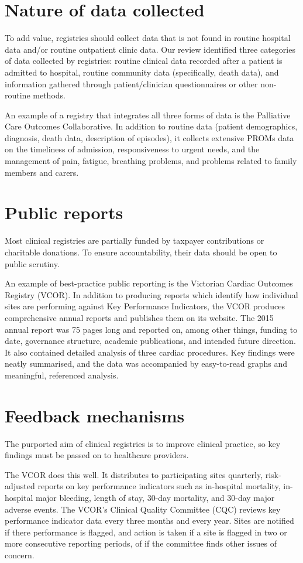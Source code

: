 \documentclass[FrontPage]{grattan}
\begin{document}
\section{Nature of data collected}
To add value, registries should collect data that is not found in routine hospital data and/or routine outpatient clinic data. Our review identified three categories of data collected by registries: routine clinical data recorded after a patient is admitted to hospital, routine community data (specifically, death data), and information gathered through patient/clinician questionnaires or other non-routine methods. 

An example of a registry that integrates all three forms of data is the Palliative Care Outcomes Collaborative. In addition to routine data (patient demographics, diagnosis, death data, description of episodes), it collects extensive PROMs data on the timeliness of admission, responsiveness to urgent needs, and the management of pain, fatigue, breathing problems, and problems related to family members and carers.

\section{Public reports}
Most clinical registries are partially funded by taxpayer contributions or charitable donations. To ensure accountability, their data should be open to public scrutiny. 

An example of best-practice public reporting is the Victorian Cardiac Outcomes Registry (VCOR). In addition to producing reports which identify how individual sites are performing against Key Performance Indicators, the VCOR produces comprehensive annual reports and publishes them on its website. The 2015 annual report was 75 pages long and reported on, among other things, funding to date, governance structure, academic publications, and intended future direction. It also contained detailed analysis of three cardiac procedures. Key findings were neatly summarised, and the data was accompanied by easy-to-read graphs and meaningful, referenced analysis.

\section{Feedback mechanisms}
The purported aim of clinical registries is to improve clinical practice, so key findings must be passed on to healthcare providers. 

The VCOR does this well. It distributes to participating sites quarterly, risk-adjusted reports on key performance indicators such as in-hospital mortality, in-hospital major bleeding, length of stay, 30-day mortality, and 30-day major adverse events. The VCOR’s Clinical Quality Committee (CQC) reviews key performance indicator data every three months and every year. Sites are notified if there performance is flagged, and action is taken if a site is flagged in two or more consecutive reporting periods, of if the committee finds other issues of concern.
\end{document}
